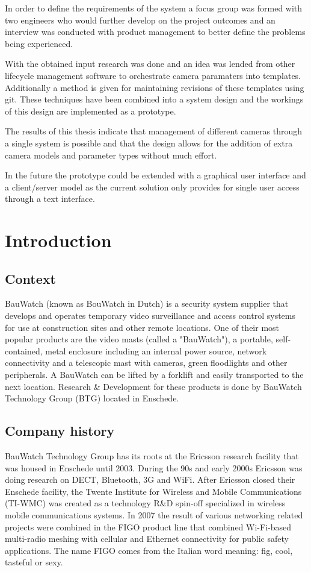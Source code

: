 In order to define the requirements of the system a focus group was formed with two engineers who would further develop on the project outcomes and an interview was conducted with product management to better define the problems being experienced.

With the obtained input research was done and an idea was lended from other lifecycle management software to orchestrate camera paramaters into templates.
Additionally a method is given for maintaining revisions of these templates using git.
These techniques have been combined into a system design and the workings of this design are implemented as a prototype.

The results of this thesis indicate that management of different cameras through a single system is possible and that the design allows for the addition of extra camera models and parameter types without much effort.

In the future the prototype could be extended with a graphical user interface and a client/server model as the current solution only provides for single user access through a text interface.
\thispagestyle{empty}

\thispagestyle{empty}
\tableofcontents
\thispagestyle{empty}

\chapter{Introduction}

\section{Context}
BauWatch (known as BouWatch in Dutch) is a security system supplier that develops and operates temporary video surveillance and access control systems for use at construction sites and other remote locations.
One of their most popular products are the video masts (called a "BauWatch"), a portable, self-contained, metal enclosure including an internal
power source, network connectivity and a telescopic mast with cameras, green floodlights and other peripherals. A BauWatch can be lifted by a forklift and
easily transported to the next location. Research \& Development for these products is done by BauWatch Technology Group (BTG) located in Enschede.

\section{Company history}
BauWatch Technology Group has its roots at the Ericsson research facility that was housed in Enschede until 2003. During the 90s and early 2000s Ericsson was doing
research on DECT, Bluetooth, 3G and WiFi. After Ericsson closed their Enschede facility, the Twente Institute for Wireless and Mobile Communications (TI-WMC) was created as a technology R\&D spin-off specialized in wireless mobile communications systems. In 2007 the result of various networking related projects were combined in the FIGO product line that combined Wi-Fi-based multi-radio meshing with cellular and Ethernet connectivity for public safety applications\cite{noauthor_twente_nodate}. The name FIGO comes from the Italian word meaning: fig, cool, tasteful or sexy.

